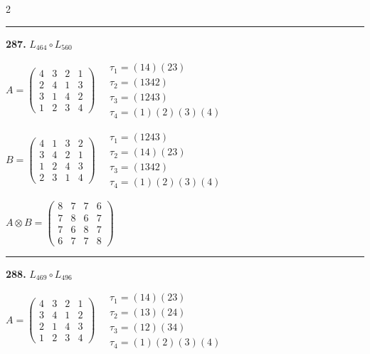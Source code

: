 \begin{multicols}{2}
\vspace{0.3em}
\hrule
\vspace{0.3em}

\noindent\textbf{287.} $L_{464} \circ L_{560}$

$A = \begin{pmatrix} 4 & 3 & 2 & 1 \\ 2 & 4 & 1 & 3 \\ 3 & 1 & 4 & 2 \\ 1 & 2 & 3 & 4 \end{pmatrix} \quad \begin{matrix} \tau_{1}=(1 4)(2 3) \\ \tau_{2}=(1 3 4 2) \\ \tau_{3}=(1 2 4 3) \\ \tau_{4}=(1)(2)(3)(4) \end{matrix}$

$B = \begin{pmatrix} 4 & 1 & 3 & 2 \\ 3 & 4 & 2 & 1 \\ 1 & 2 & 4 & 3 \\ 2 & 3 & 1 & 4 \end{pmatrix} \quad \begin{matrix} \tau_{1}=(1 2 4 3) \\ \tau_{2}=(1 4)(2 3) \\ \tau_{3}=(1 3 4 2) \\ \tau_{4}=(1)(2)(3)(4) \end{matrix}$

$A \otimes B = \begin{pmatrix} 8 & 7 & 7 & 6 \\ 7 & 8 & 6 & 7 \\ 7 & 6 & 8 & 7 \\ 6 & 7 & 7 & 8 \end{pmatrix}$

\vspace{0.3em}
\hrule
\vspace{0.3em}

\noindent\textbf{288.} $L_{469} \circ L_{496}$

$A = \begin{pmatrix} 4 & 3 & 2 & 1 \\ 3 & 4 & 1 & 2 \\ 2 & 1 & 4 & 3 \\ 1 & 2 & 3 & 4 \end{pmatrix} \quad \begin{matrix} \tau_{1}=(1 4)(2 3) \\ \tau_{2}=(1 3)(2 4) \\ \tau_{3}=(1 2)(3 4) \\ \tau_{4}=(1)(2)(3)(4) \end{matrix}$


\end{multicols}
